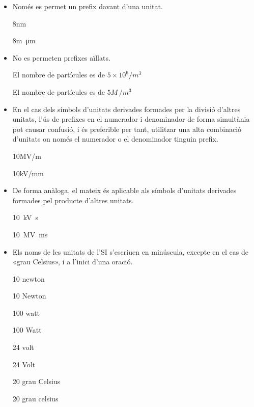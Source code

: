\begin{itemize}
\textcolor{Red}\faTimesCircle{}  12\unit{kg\,/(mm)^2}


\item Només es permet un prefix davant d'una unitat.

\textcolor{Green}\faCheckSquare{} 8\unit{nm}

\textcolor{Red}\faTimesCircle{} 8\unit{m\micro m}


\item No es permeten prefixes aïllats.

\textcolor{Green}\faCheckSquare{} El nombre de partícules es de $5\times 10^6 /\unit{m^3}$

\textcolor{Red}\faTimesCircle{} El nombre de partícules es de $5 \unit{M\,/m^3}$


\item En el cas dels símbols d'unitats derivades formades per la divisió
d'altres unitats, l'ús de prefixes en el numerador i denominador de
forma simultània pot causar confusió, i és preferible per tant,
utilitzar una alta combinació d'unitats on només el numerador o el
denominador tinguin prefix.

\textcolor{Green}\faCheckSquare{} 10\unit{MV/m}

\textcolor{Blue}\faQuestionCircle{}  10\unit{kV/mm}


\item De forma anàloga, el mateix és aplicable als símbols d'unitats
derivades formades pel producte d'altres unitats.

\textcolor{Green}\faCheckSquare{} \SI{10}{kV.s}

\textcolor{Blue}\faQuestionCircle{}  \SI{10}{MV.ms}


\item Els noms de les unitats de l'SI s'escriuen en minúscula, excepte en
el cas de «grau Celsius», i a l'inici d'una oració.

\textcolor{Green}\faCheckSquare{} 10 newton

\textcolor{Red}\faTimesCircle{} 10 Newton

\textcolor{Green}\faCheckSquare{}  100 watt

\textcolor{Red}\faTimesCircle{} 100 Watt

\textcolor{Green}\faCheckSquare{}  24 volt

\textcolor{Red}\faTimesCircle{} 24 Volt

\textcolor{Green}\faCheckSquare{}  20 grau Celsius

\textcolor{Red}\faTimesCircle{} 20 grau celsius



\end{itemize}
